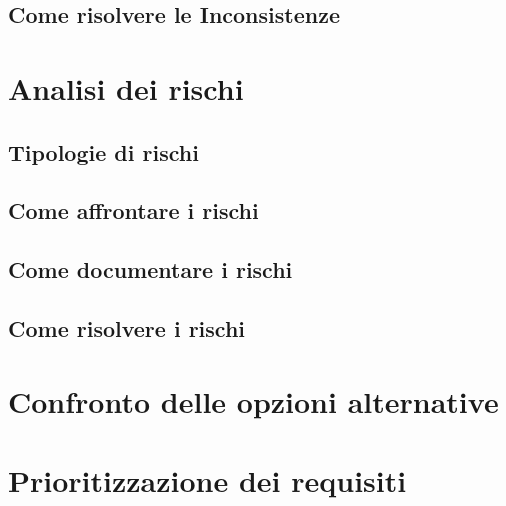 \subsection{Come risolvere le Inconsistenze}

\section{Analisi dei rischi}
\subsection{Tipologie di rischi}
\subsection{Come affrontare i rischi}
\subsection{Come documentare i rischi}
\subsection{Come risolvere i rischi}

\section{Confronto delle opzioni alternative}

\section{Prioritizzazione dei requisiti}